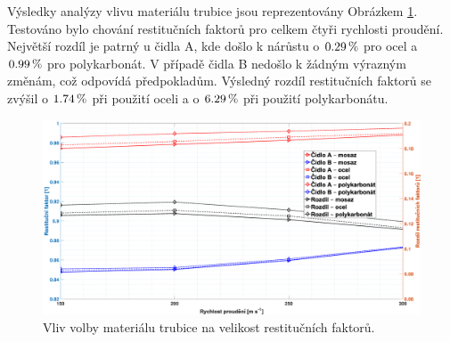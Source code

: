             \begin{table}[ht!]
                \centering
                \caption{Zkoumané materiály trubice.}
                \label{tab:final-materialy}
            \end{table}

            \newpage

            Výsledky analýzy vlivu materiálu trubice jsou reprezentovány Obrázkem \ref{fig:sonda-final-materialy}. Testováno bylo chování restitučních faktorů pro celkem čtyři rychlosti proudění. Největší rozdíl je patrný u čidla A, kde došlo k nárůstu o $0.29 \, \%$ pro ocel a $0.99 \, \%$ pro polykarbonát. V případě čidla B nedošlo k žádným výrazným změnám, což odpovídá předpokladům. Výsledný rozdíl restitučních faktorů se zvýšil o $1.74 \, \%$ při použití oceli a o $6.29 \, \%$ při použití polykarbonátu.

            \begin{figure}[ht!]
                \centering
                \includegraphics*[width=\textwidth]{500_FINAL/final_material.eps}
                \caption{Vliv volby materiálu trubice na velikost restitučních faktorů.}
                \label{fig:sonda-final-materialy}
            \end{figure}


        
        